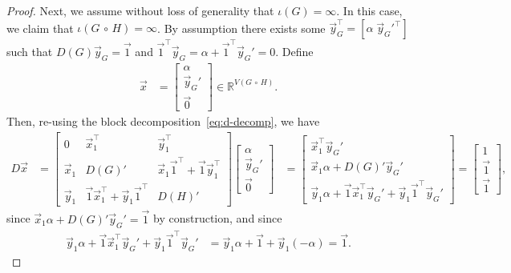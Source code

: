 \documentclass[11pt,a4paper]{article}
\newcommand{\distmatrix}{D}
\newcommand{\x}{\vec{x}}
\newcommand{\y}{\vec{y}}
\newcommand{\one}{\vec{1}}
\newcommand{\Circ}{\circ}
\begin{document}
\begin{proof}
        Next, we assume without loss of generality that $\iota(G) = \infty$. In this case, we claim that $\iota(G\,\Circ\,H) = \infty$. By assumption there exists some $\y_G^\top = [\alpha\; \y_G'^\top]$ such that $\distmatrix(G)\y_G = \one$ and $\one^\top \y_G = \alpha + \one^\top \y_G' = 0$.  Define
            \begin{align*}
                \x &= \begin{bmatrix}
                    \alpha \\ \y_G' \\ \vec{0}
                \end{bmatrix} \in\mathbb{R}^{V(G\,\Circ\,H)}.
            \end{align*}
        Then, re-using the block decomposition~\cref{eq:d-decomp}, we have
            \begin{align*}
                \distmatrix \x &= \begin{bmatrix}
                    0 & \x_{1}^\top & \y_{1}^\top\\
                    \x_{1} & {\distmatrix(G)}' & \x_{1}\one^\top + \one \y_{1}^\top\\
                    \y_{1} & \one \x_{1}^\top + \y_{1}\one^\top & {\distmatrix(H)}'
                \end{bmatrix}\begin{bmatrix}
                    \alpha \\ \y_G' \\ \vec{0}
                \end{bmatrix} &= \begin{bmatrix}
                    \x_{1}^\top \y_G'\\
                    \x_{1} \alpha + {\distmatrix(G)}' \y_G'\\
                    \y_{1} \alpha + \one \x_{1}^\top \y_G' + \y_1\one^\top\y_G'
                \end{bmatrix} = \begin{bmatrix}
                    1\\
                    \one\\
                    \one
                \end{bmatrix},
            \end{align*}
        since $\x_1 \alpha + {\distmatrix(G)}' \y_G' = \one$ by construction, and since
            \begin{align*}
                \y_{1} \alpha + \one \x_{1}^\top \y_G' + \y_1\one^\top\y_G' &= \y_{1} \alpha + \one + \y_1(-\alpha) = \one.

\end{align*}
\end{proof}
\end{document}
